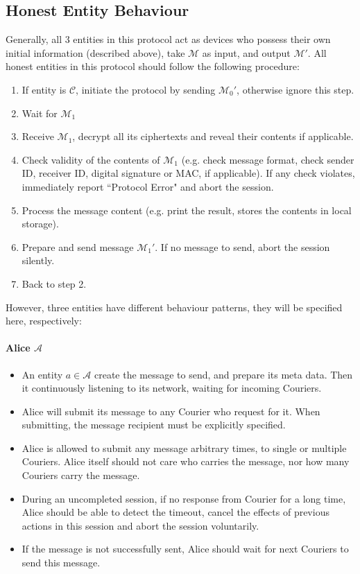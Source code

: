 \subsection{Honest Entity Behaviour}
Generally, all 3 entities in this protocol act as devices who possess their own initial information (described above), take $\mathcal{M}$ as input, and output $\mathcal{M'}$. All honest entities in this protocol should follow the following procedure:
\begin{enumerate}
\item If entity is $\mathcal{C}$, initiate the protocol by sending ${\mathcal{M}_0}'$, otherwise ignore this step.
\item Wait for $\mathcal{M}_1$
\item Receive $\mathcal{M}_1$, decrypt all its ciphertexts and reveal their contents if applicable.
\item Check validity of the contents of $\mathcal{M}_1$ (e.g. check message format, check sender ID, receiver ID, digital signature or MAC, if applicable). If any check violates, immediately report ``Protocol Error" and abort the session.
\item Process the message content (e.g. print the result, stores the contents in local storage).
\item Prepare and send message ${\mathcal{M}_1}'$. If no message to send, abort the session silently.
\item Back to step 2.
\end{enumerate}

However, three entities have different behaviour patterns, they will be specified here, respectively:
\paragraph{Alice $\mathcal{A}$}
\begin{itemize}
\item An entity $a \in \mathcal{A}$ create the message to send, and prepare its meta data. Then it continuously listening to its network, waiting for incoming Couriers.

\item Alice will submit its message to any Courier who request for it. When submitting, the message recipient must be explicitly specified.

\item Alice is allowed to submit any message arbitrary times, to single or multiple Couriers. Alice itself should not care who carries the message, nor how many Couriers carry the message.

\item During an uncompleted session, if no response from Courier for a long time, Alice should be able to detect the timeout, cancel the effects of previous actions in this session and abort the session voluntarily.

\item If the message is not successfully sent, Alice should wait for next Couriers to send this message.
\end{itemize}

